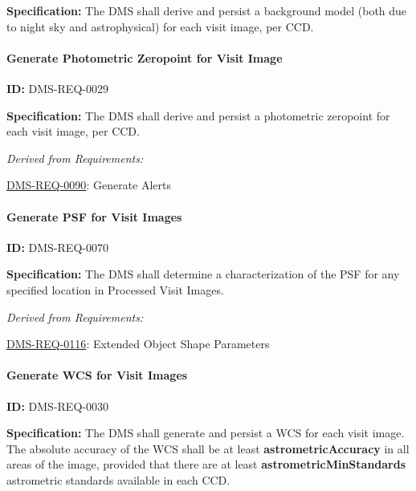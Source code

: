 \documentclass[SE,toc,lsstdraft]{lsstdoc}
\begin{document}
\textbf{Specification: }The DMS shall derive and persist a background model (both due to night sky and astrophysical) for each visit image, per CCD.







\paragraph{Generate Photometric Zeropoint for Visit Image}\hfill  %

\label{DMS-REQ-0029}
\textbf{ID:} DMS-REQ-0029

\textbf{Specification:} The DMS shall derive and persist a photometric zeropoint for each visit image, per CCD.






\emph{Derived from Requirements:}

\hyperref[DMS-REQ-0090]{DMS-REQ-0090}:
Generate Alerts \newline


\paragraph{Generate PSF for Visit Images}\hfill  %

\label{DMS-REQ-0070}
\textbf{ID:} DMS-REQ-0070

\textbf{Specification:} The DMS shall determine a characterization of the PSF for any specified location in Processed Visit Images.






\emph{Derived from Requirements:}

\hyperref[DMS-REQ-0116]{DMS-REQ-0116}:
Extended Object Shape Parameters \newline


\paragraph{Generate WCS for Visit Images}\hfill  %

\label{DMS-REQ-0030}
\textbf{ID:} DMS-REQ-0030

\textbf{Specification:} The DMS shall generate and persist a WCS for each visit image.  The absolute accuracy of the WCS shall be at least \textbf{astrometricAccuracy} in all areas of the image, provided that there are at least \textbf{astrometricMinStandards} astrometric standards available in each CCD.
\end{document}
